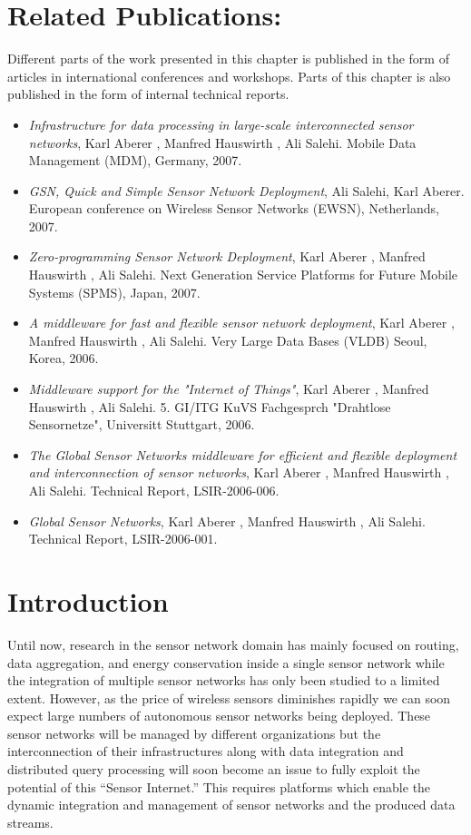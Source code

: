 \section*{Related Publications:}
Different parts of the work presented in this chapter is published in the form of articles in international conferences and workshops.
Parts of this chapter is also published in the form of internal technical reports.
\begin{itemize}
\item \emph{Infrastructure for data processing in large-scale interconnected sensor networks}, Karl Aberer , Manfred Hauswirth , Ali Salehi. Mobile Data Management (MDM), Germany, 2007.
\item \emph{GSN, Quick and Simple Sensor Network Deployment}, Ali Salehi, Karl Aberer. European conference on Wireless Sensor Networks (EWSN), Netherlands, 2007.
\item \emph{Zero-programming Sensor Network Deployment}, Karl Aberer , Manfred Hauswirth , Ali Salehi. Next Generation Service Platforms for Future Mobile Systems (SPMS), Japan, 2007.
\item \emph{A middleware for fast and flexible sensor network deployment}, Karl Aberer , Manfred Hauswirth , Ali Salehi. Very Large Data Bases (VLDB) Seoul, Korea, 2006.
\item \emph{Middleware support for the "Internet of Things"}, Karl Aberer , Manfred Hauswirth , Ali Salehi. 5. GI/ITG KuVS Fachgesprch "Drahtlose Sensornetze", Universitt Stuttgart, 2006.
\item \emph{The Global Sensor Networks middleware for efficient and flexible deployment and interconnection of sensor networks}, Karl Aberer , Manfred Hauswirth , Ali Salehi.
Technical Report, LSIR-2006-006.
\item \emph{Global Sensor Networks}, Karl Aberer , Manfred Hauswirth , Ali Salehi. Technical Report, LSIR-2006-001.
\end{itemize}
\newpage
\section{Introduction}
\label{sec:introduction}

Until now, research in the sensor network domain has mainly focused on
routing, data aggregation, and energy conservation inside a single
sensor network while the integration of multiple sensor networks has
only been studied to a limited extent. However, as the price of
wireless sensors diminishes rapidly we can soon expect large numbers
of autonomous sensor networks being deployed. These sensor networks
will be managed by different organizations but the interconnection of
their infrastructures along with data integration and distributed
query processing will soon become an issue to fully exploit the
potential of this ``Sensor Internet.'' This requires platforms which
enable the dynamic integration and management of sensor networks and
the produced data streams.

